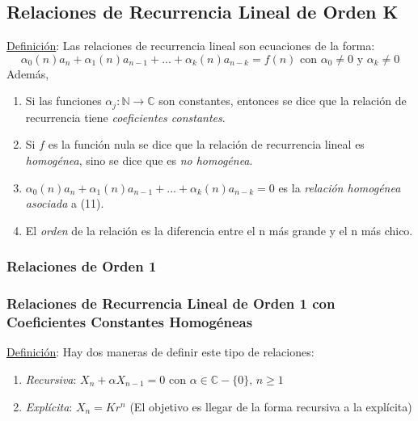 \documentclass{article}
\newcommand{\comma}{,\,}                                %
\newcommand{\naturales}{\mathbb{N}}                     %
\newcommand{\complejos}{\mathbb{C}}                     %
\begin{document}
\subsection{Relaciones de Recurrencia Lineal de Orden K}
\underline{Definición}: Las relaciones de recurrencia lineal son ecuaciones de la forma:
\begin{equation*}
    \alpha_0(n)a_n + \alpha_1(n)a_{n-1} + ... + \alpha_k(n)a_{n-k} = f(n) \text{ con } \alpha_0 \neq 0 \text{ y } \alpha_k \neq 0
\end{equation*}
Además,
\begin{enumerate}
    \item Si las funciones $\alpha_j: \naturales \rightarrow \complejos$ son constantes, entonces se dice que la relación de recurrencia tiene \emph{coeficientes constantes}.
    \item Si $f$ es la función nula se dice que la relación de recurrencia lineal es \emph{homogénea}, sino se dice que es \emph{no homogénea}.
    \item $\alpha_0(n)a_n + \alpha_1(n)a_{n-1} + ... + \alpha_k(n)a_{n-k} = 0$ es la \emph{relación homogénea asociada} a (11).
    \item El \emph{orden} de la relación es la diferencia entre el n más grande y el n más chico.
\end{enumerate}
\subsubsection{Relaciones de Orden 1}
\subsubsection*{Relaciones de Recurrencia Lineal de Orden 1 con Coeficientes Constantes Homogéneas}
\underline{Definición}: Hay dos maneras de definir este tipo de relaciones:
\begin{enumerate}
    \item \emph{Recursiva}: $X_n + \alpha X_{n-1} = 0 \text{ con } \alpha \in \complejos-\{0\} \comma n \geq 1$
    \item \emph{Explícita}: $X_n = Kr^n$ (El objetivo es llegar de la forma recursiva a la explícita)
\end{enumerate}
\end{document}
